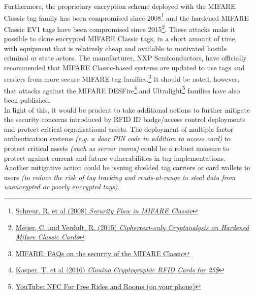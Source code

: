 \noindent Furthermore, the proprietary encryption scheme deployed with the MIFARE Classic tag family has been compromised since 2008\footnote{\href{http://www.cs.ru.nl/~flaviog/publications/Security_Flaw_in_MIFARE_Classic.pdf}{Schreur, R. et al (2008) \textit{Security Flaw in MIFARE Classic}}} and the hardened MIFARE Classic EV1 tags have been compromised since 2015\footnote{\href{http://cs.ru.nl/~rverdult/Ciphertext-only_Cryptanalysis_on_Hardened_Mifare_Classic_Cards-CCS_2015.pdf}{Meijer, C. and Verdult, R. (2015) \textit{Ciphertext-only Cryptanalysis on Hardened Mifare Classic Cards}}}. These attacks make it possible to clone encrypted MIFARE Classic tags, in a short amount of time, with equipment that is relatively cheap and available to motivated hostile criminal or state actors. The manufacturer, NXP Semiconductors, have officially recommended that MIFARE Classic-based systems are updated to use tags and readers from more secure MIFARE tag families.\footnote{\href{https://www.mifare.net/en/products/chip-card-ics/mifare-classic/frequently-asked-questions/}{MIFARE: FAQs on the security of the MIFARE Classic}} It should be noted, however, that attacks against the MIFARE DESFire\footnote{\href{http://www.proxmark.org/files/Documents/13.56\%20MHz\%20-\%20MIFARE\%20DESFire/Cloning_Cryptographic_RFID_Cards_for_25USD-WISSEC_2010.pdf}{Kasper, T. et al (2016) \textit{Cloning Cryptographic RFID Cards for 25\$}}} and Ultralight\footnote{\href{https://www.youtube.com/watch?v=-uvvVMHnC3c}{YouTube: NFC For Free Rides and Rooms (on your phone)}} families have also been published.\\

\noindent In light of this, it would be prudent to take additional actions to further mitigate the security concerns introduced by RFID ID badge/access control deployments and protect critical organisational assets. The deployment of multiple factor authentication systems \textit{(e.g. a door PIN code in addition to access card)} to protect critical assets \textit{(such as server rooms)} could be a robust measure to protect against current and future vulnerabilities in tag implementations. Another mitigative action could be issuing shielded tag carriers or card wallets to users \textit{(to reduce the risk of tag tracking and reads-at-range to steal data from unencrypted or poorly encrypted tags)}.\\

